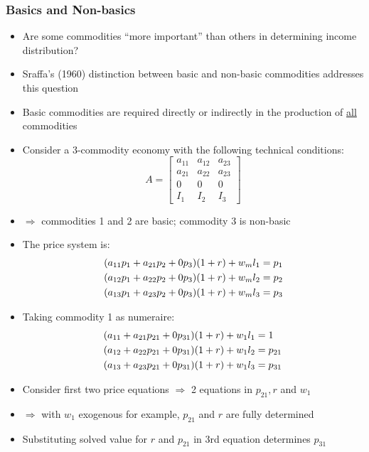 \documentclass{article}
\begin{document}
\subsubsection{Basics and Non-basics}
	\begin{itemize}
		\item Are some commodities ``more important'' than others in determining income distribution? 
		\item Sraffa's (1960) distinction between basic and non-basic commodities addresses this question
		\item Basic commodities are required directly or indirectly in the production of \underline{all} commodities
		\item  Consider a 3-commodity economy with the following technical conditions:
		\[
		A =
		\begin{bmatrix}
			a_{11} & a_{12} & a_{23} \\
			a_{21} & a_{22} & a_{23} \\
			0 & 0 & 0 \\
			I_1 & I_2 & I_3
		\end{bmatrix}
		\]
		\item \( \Rightarrow \) commodities 1 and 2 are basic; commodity 3 is non-basic
		\item  The price system is:
		\begin{gather}
			(a_{11} p_1 + a_{21} p_2 + 0p_3) (1+r) + w_m l_1 = p_1 \notag \\
			(a_{12} p_1 + a_{22} p_2 + 0p_3) (1+r) + w_m l_2 = p_2 \notag \\
			(a_{13} p_1 + a_{23} p_2 + 0p_3) (1+r) + w_m l_3 = p_3 \label{E:2.19}
		\end{gather}
		\item  Taking commodity 1 as numeraire: 
		\begin{align}
			(a_{11} + a_{21} p_{21} + 0p_{31}) (1+r) + w_1 l_1 &= 1 \notag \\
			(a_{12} + a_{22} p_{21} + 0p_{31}) (1+r) + w_1 l_2 &= p_{21} \notag \\
			(a_{13} + a_{23} p_{21} + 0p_{31}) (1+r) + w_1 l_3 &= p_{31} \label{E:2.20}
		\end{align}
		\item Consider first two price equations \( \Rightarrow \) 2 equations in \( p_{21}, r \) and \( w_1 \)
		\item \( \Rightarrow \) with \( w_1 \) exogenous for example, \( p_{21} \) and \( r \) are fully determined
		\item Substituting solved value for \( r \) and \( p_{21} \) in 3rd equation determines \( p_{31} \)

\end{itemize}
\end{document}

